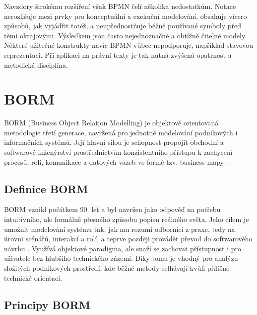 Navzdory širokému rozšíření však BPMN čelí několika nedostatkům. Notace nerozlišuje mezi prvky pro konceptuální a exekuční modelování, obsahuje vícero způsobů, jak vyjádřit totéž, a neupřednostňuje běžně používané symboly před těmi okrajovými. Výsledkem jsou často nejednoznačné a obtížně čitelné modely. Některé užitečné konstrukty navíc BPMN vůbec nepodporuje, například stavovou reprezentaci. \cite{Pergl2023BPMN,Aagesen2015} Při aplikaci na právní texty je tak nutná zvýšená opatrnost a metodická disciplína. 



\section{BORM}
\label{sec:borm}

BORM (Business Object Relation Modelling) je objektově orientovaná metodologie třetí generace, navržená pro jednotné modelování podnikových i informačních systémů. Její hlavní silou je schopnost propojit obchodní a softwarové inženýrství prostřednictvím konzistentního přístupu k zachycení procesů, rolí, komunikace a datových vazeb ve formě tzv. business mapy \cite{Knott2006,Pergl2021BORM}.


\subsection{Definice BORM}
\label{sec:definice-borm}

BORM vznikl počátkem 90. let a byl navržen jako odpověď na potřebu intuitivního, ale formálně přesného způsobu popisu reálného světa. Jeho cílem je umožnit modelování systému tak, jak mu rozumí odborníci z praxe, tedy na úrovni scénářů, interakcí a rolí, a teprve později provádět převod do softwarového návrhu \cite{Knott2003}. Využívá objektové paradigma, ale snaží se zachovat přístupnost i pro uživatele bez hlubšího technického zázemí. Díky tomu je vhodný pro analýzu složitých podnikových prostředí, kde běžné metody selhávají kvůli přílišné technické orientaci. \cite{Knott2006}


\subsection{Principy BORM}
\label{sec:principy-borm}

